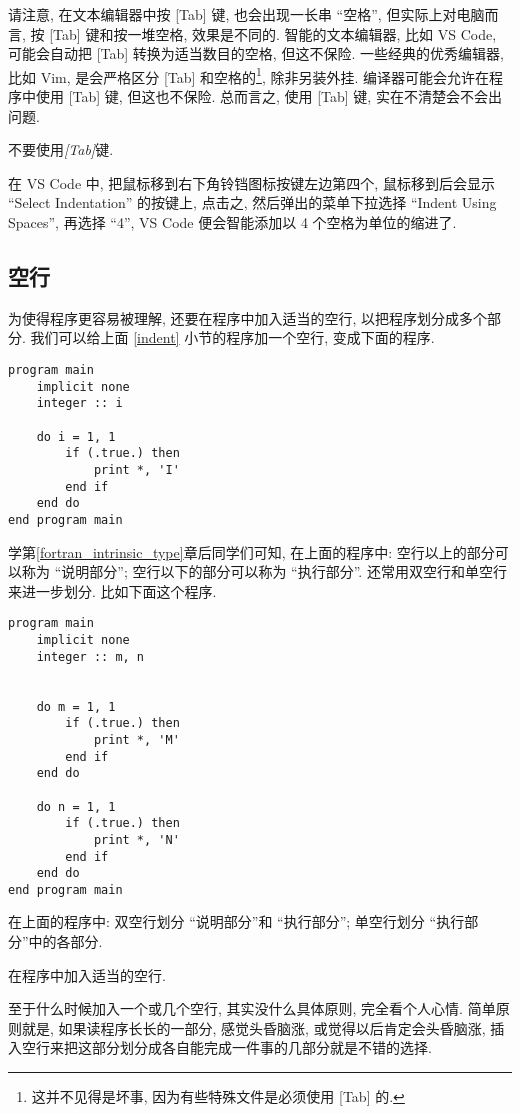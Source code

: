 请注意, 在文本编辑器中按 [Tab] 键, 也会出现一长串 ``空格'', 但实际上对电脑而言, 按 [Tab] 键和按一堆空格, 效果是不同的. 智能的文本编辑器, 比如 VS Code, 可能会自动把 [Tab] 转换为适当数目的空格, 但这不保险. 一些经典的优秀编辑器, 比如 Vim, 是会严格区分 [Tab] 和空格的\footnote{
    这并不见得是坏事, 因为有些特殊文件是必须使用 [Tab] 的.
}, 除非另装外挂. 编译器可能会允许在程序中使用 [Tab] 键, 但这也不保险. 总而言之, 使用 [Tab] 键, 实在不清楚会不会出问题.
\begin{convention}
    不要使用\emph{[Tab]}键.
\end{convention}

在 VS Code 中, 把鼠标移到右下角铃铛图标按键左边第四个, 鼠标移到后会显示 ``Select Indentation'' 的按键上, 点击之, 然后弹出的菜单下拉选择 ``Indent Using Spaces'', 再选择 ``4'', VS Code 便会智能添加以 4 个空格为单位的缩进了.

\subsection{空行}\label{empty_line}

为使得程序更容易被理解, 还要在程序中加入适当的空行, 以把程序划分成多个部分. 我们可以给上面 \ref{indent} 小节的程序加一个空行, 变成下面的程序.
\begin{lstlisting}
program main
    implicit none
    integer :: i

    do i = 1, 1
        if (.true.) then
            print *, 'I'
        end if
    end do
end program main
\end{lstlisting}
学第\ref{fortran_intrinsic_type}章后同学们可知, 在上面的程序中: 空行以上的部分可以称为 ``说明部分''; 空行以下的部分可以称为 ``执行部分''. 还常用双空行和单空行来进一步划分. 比如下面这个程序.
\begin{lstlisting}
program main
    implicit none
    integer :: m, n


    do m = 1, 1
        if (.true.) then
            print *, 'M'
        end if
    end do

    do n = 1, 1
        if (.true.) then
            print *, 'N'
        end if
    end do
end program main
\end{lstlisting}
在上面的程序中: 双空行划分 ``说明部分''和 ``执行部分''; 单空行划分 ``执行部分''中的各部分.
\begin{convention}
    在程序中加入适当的空行.
\end{convention}
至于什么时候加入一个或几个空行, 其实没什么具体原则, 完全看个人心情. 简单原则就是, 如果读程序长长的一部分, 感觉头昏脑涨, 或觉得以后肯定会头昏脑涨, 插入空行来把这部分划分成各自能完成一件事的几部分就是不错的选择.

